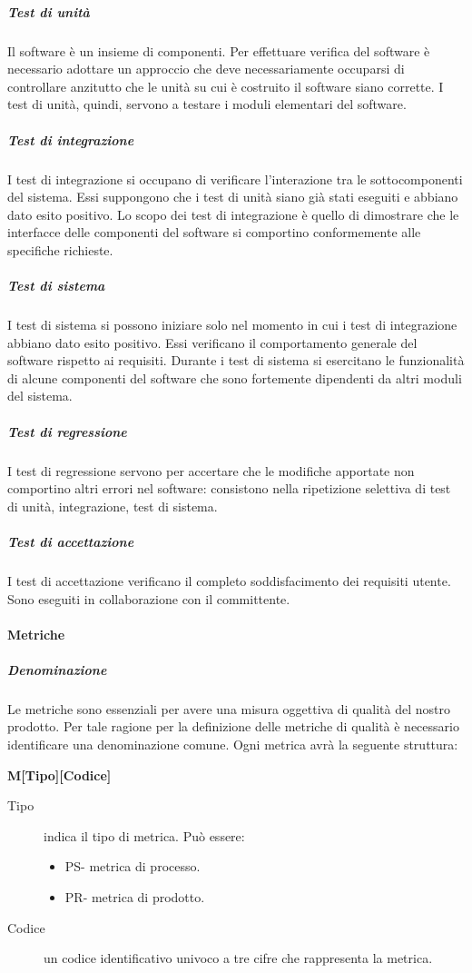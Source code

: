 \documentclass[../norme-di-progetto.tex]{subfiles}
\begin{document}
\subparagraph{Test di unità}%
\label{subp:test_di_unita}
Il software è un insieme di componenti. Per effettuare verifica del software è necessario adottare un approccio  che deve necessariamente occuparsi di controllare anzitutto che le unità su cui è costruito il software siano corrette. I test di unità, quindi, servono a testare i moduli elementari del software.

\subparagraph{Test di integrazione}%
\label{subp:test_di_integrazione}
I test di integrazione si occupano di verificare l'interazione tra le sottocomponenti del sistema. Essi suppongono che i test di unità siano già stati eseguiti e abbiano dato esito positivo. Lo scopo dei test di integrazione è quello di dimostrare che le interfacce delle componenti del software si comportino conformemente alle specifiche richieste.

\subparagraph{Test di sistema}%
\label{test_di_sistema}
I test di sistema si possono iniziare solo nel momento in cui i test di integrazione abbiano dato esito positivo. Essi verificano il comportamento generale del software rispetto ai requisiti. Durante i test di sistema si esercitano le funzionalità di alcune componenti del software che sono fortemente dipendenti da altri moduli del sistema.

\subparagraph{Test di regressione}%
\label{test_di_regressione}
I test di regressione servono per accertare che le modifiche apportate non comportino altri errori nel software: consistono nella ripetizione selettiva di test di unità, integrazione, test di sistema.

\subparagraph{Test di accettazione}%
\label{test_di_accettazione}
I test di accettazione verificano il completo soddisfacimento dei requisiti utente. Sono eseguiti in collaborazione con il committente.

\paragraph{Metriche}%
\label{par:metriche}

\subparagraph{Denominazione}%
\label{subp:denominazione}
Le metriche sono essenziali per avere una misura oggettiva di qualità del nostro prodotto.
Per tale ragione per la definizione delle metriche di qualità è necessario identificare una denominazione comune.
Ogni metrica avrà la seguente struttura:
\begin{center}
          \textbf{M[Tipo][Codice]}
\end{center}
\begin{description}
  \item [Tipo] indica il tipo di metrica. Può essere:
  \begin{itemize}
      \item PS- metrica di processo.
      \item PR- metrica di prodotto.
  \end{itemize}
  \item [Codice] un codice identificativo univoco a tre cifre che rappresenta la metrica.
\end{description}
\end{document}
